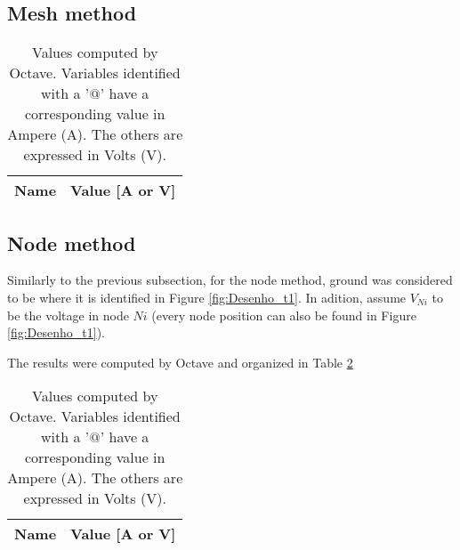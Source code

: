 \subsection{Mesh method}
\label{subsec:mesh_met}




\begin{table}[h]
	\centering
	\begin{tabular}{|l|r|}
    		\hline    
    		{\bf Name} & {\bf Value [A or V]} \\ \hline
    		
  	\end{tabular}
  	\caption{Values computed by Octave. Variables identified with a '$@$' have a
  	corresponding value in Ampere (A). The others are expressed in Volts (V).}
 
\label{tab:mesh}
\end{table}




\subsection{Node method}
\label{subsec:node_met}


Similarly to the previous subsection, for the node method, ground was considered to be where it is identified in
Figure \ref{fig:Desenho_t1}. In adition, assume $V_{Ni}$ to be the voltage in node $Ni$ (every node position can
also be found in Figure \ref{fig:Desenho_t1}).

The results were computed by Octave and organized in Table \ref{tab:node}

\begin{table}[h]
	\centering
	\begin{tabular}{|l|r|}
    		\hline    
    		{\bf Name} & {\bf Value [A or V]} \\ \hline
    		
  	\end{tabular}
  	\caption{Values computed by Octave. Variables identified with a '$@$' have a
  	corresponding value in Ampere (A). The others are expressed in Volts (V).}
 
\label{tab:node}
\end{table}


